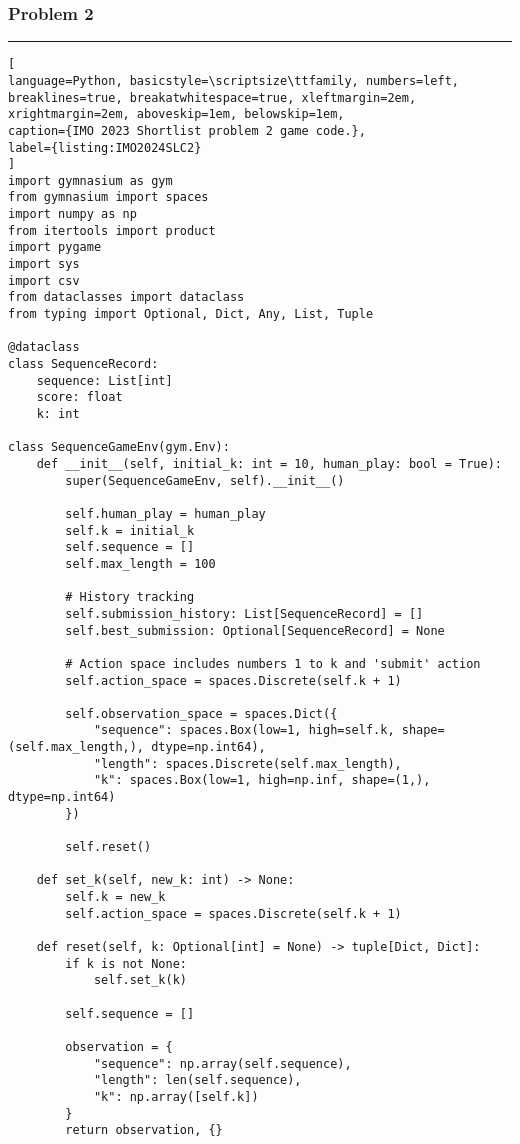\newpage
\clearpage

\subsubsection*{Problem 2}
\label{appendix:G_2023_IMO_Shortlist_C2}

\hrule
\begin{lstlisting}[
language=Python, basicstyle=\scriptsize\ttfamily, numbers=left, breaklines=true, breakatwhitespace=true, xleftmargin=2em, xrightmargin=2em, aboveskip=1em, belowskip=1em,
caption={IMO 2023 Shortlist problem 2 game code.},
label={listing:IMO2024SLC2}
]
import gymnasium as gym
from gymnasium import spaces
import numpy as np
from itertools import product
import pygame
import sys
import csv
from dataclasses import dataclass
from typing import Optional, Dict, Any, List, Tuple

@dataclass
class SequenceRecord:
    sequence: List[int]
    score: float
    k: int

class SequenceGameEnv(gym.Env):
    def __init__(self, initial_k: int = 10, human_play: bool = True):
        super(SequenceGameEnv, self).__init__()
        
        self.human_play = human_play
        self.k = initial_k
        self.sequence = []
        self.max_length = 100
        
        # History tracking
        self.submission_history: List[SequenceRecord] = []
        self.best_submission: Optional[SequenceRecord] = None
        
        # Action space includes numbers 1 to k and 'submit' action
        self.action_space = spaces.Discrete(self.k + 1)
        
        self.observation_space = spaces.Dict({
            "sequence": spaces.Box(low=1, high=self.k, shape=(self.max_length,), dtype=np.int64),
            "length": spaces.Discrete(self.max_length),
            "k": spaces.Box(low=1, high=np.inf, shape=(1,), dtype=np.int64)
        })
        
        self.reset()

    def set_k(self, new_k: int) -> None:
        self.k = new_k
        self.action_space = spaces.Discrete(self.k + 1)

    def reset(self, k: Optional[int] = None) -> tuple[Dict, Dict]:
        if k is not None:
            self.set_k(k)
        
        self.sequence = []
        
        observation = {
            "sequence": np.array(self.sequence),
            "length": len(self.sequence),
            "k": np.array([self.k])
        }
        return observation, {}


\end{lstlisting}
